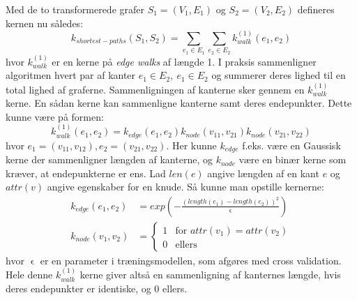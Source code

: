 \documentclass{article}
\def\eps{\mathrel{\epsilon}}
\begin{document}
Med de to transformerede grafer $S_1=(V_1,E_1)$ og $S_2=(V_2,E_2)$ defineres kernen nu således:
\begin{equation}
k_{shortest-paths}(S_1,S_2)=\sum_{e_1\in E_1}\sum_{e_2\in E_2}k^{(1)}_{walk}(e_1,e_2)
\end{equation}
hvor $k^{(1)}_{walk}$ er en kerne på \textit{edge walks} af længde 1. I praksis sammenligner algoritmen hvert par af kanter $e_1\in E_2,\ e_1\in E_2$ og summerer deres lighed til en total lighed af graferne. Sammenligningen af kanterne sker gennem en $k^{(1)}_{walk}$ kerne. En sådan kerne kan sammenligne kanterne samt deres endepunkter. Dette kunne være på formen:
\begin{equation}
k^{(1)}_{walk}(e_1,e_2) = k_{edge}(e_1,e_2)k_{node}(v_{11},v_{21})k_{node}(v_{21},v_{22})
\end{equation}
hvor $e_1=(v_{11},v_{12}),e_2=(v_{21},v_{22})$. Her kunne $k_{edge}$ f.eks. være en Gaussisk kerne der sammenligner længden af kanterne, og $k_{node}$ være en binær kerne som kræver, at endepunkterne er ens. Lad $len(e)$ angive længden af en kant $e$ og $attr(v)$ angive egenskaber for en knude. Så kunne man opstille kernerne:
\begin{align}
k_{edge}(e_1,e_2)&=exp\left(-\frac{(length(e_1)-length(e_2))^2}{\eps}\right)\\
k_{node}(v_1,v_2)&=
\begin{cases}
1 & \text{for }attr(v_1)=attr(v_2)\\
0 & \text{ellers}
\end{cases}
\end{align}
hvor $\eps$ er en parameter i træningsmodellen, som afgøres med cross validation. Hele denne $k_{walk}^{(1)}$ kerne giver altså en sammenligning af kanternes længde, hvis deres endepunkter er identiske, og 0 ellers.
\end{document}
